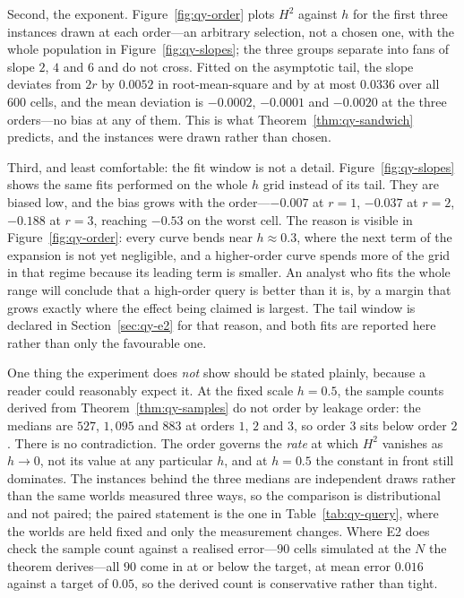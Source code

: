 Second, the exponent. Figure~\ref{fig:qy-order} plots $H^{2}$ against $h$ for the first three
instances drawn at each order---an arbitrary selection, not a chosen one, with the whole
population in Figure~\ref{fig:qy-slopes}; the three groups separate into fans of slope $2$, $4$ and $6$ and do
not cross. Fitted on the asymptotic tail, the slope deviates from $2r$ by $0.0052$ in
root-mean-square and by at most $0.0336$ over all $600$ cells, and the mean deviation is
$-0.0002$, $-0.0001$ and $-0.0020$ at the three orders---no bias at any of them. This is what
Theorem~\ref{thm:qy-sandwich} predicts, and the instances were drawn rather than chosen.
\NUM{}

Third, and least comfortable: the fit window is not a detail. Figure~\ref{fig:qy-slopes} shows the
same fits performed on the whole $h$ grid instead of its tail. They are biased low, and the
bias grows with the order---$-0.007$ at $r=1$, $-0.037$ at $r=2$, $-0.188$ at $r=3$, reaching
$-0.53$ on the worst cell. The reason is visible in Figure~\ref{fig:qy-order}: every curve bends
near $h\approx0.3$, where the next term of the expansion is not yet negligible, and a
higher-order curve spends more of the grid in that regime because its leading term is smaller.
An analyst who fits the whole range will conclude that a high-order query is better than it is,
by a margin that grows exactly where the effect being claimed is largest. The tail window is
declared in Section~\ref{sec:qy-e2} for that reason, and both fits are reported here rather than
only the favourable one.

One thing the experiment does \emph{not} show should be stated plainly, because a reader could
reasonably expect it. At the fixed scale $h=0.5$, the sample counts derived from
Theorem~\ref{thm:qy-samples} do not order by leakage order: the medians are $527$, $1{,}095$ and
$883$ at orders $1$, $2$ and $3$, so order $3$ sits below order $2$. There is no contradiction.
The order governs the \emph{rate} at which $H^{2}$ vanishes as $h\to0$, not its value at any
particular $h$, and at $h=0.5$ the constant in front still dominates. The instances behind the
three medians are independent draws rather than the same worlds measured three ways, so the
comparison is distributional and not paired; the paired statement is the one in
Table~\ref{tab:qy-query}, where the worlds are held fixed and only the measurement changes.
Where E2 does check the sample count against a realised error---$90$ cells simulated at the $N$
the theorem derives---all $90$ come in at or below the target, at mean error $0.016$ against a
target of $0.05$, so the derived count is conservative rather than tight. \NUM{}

